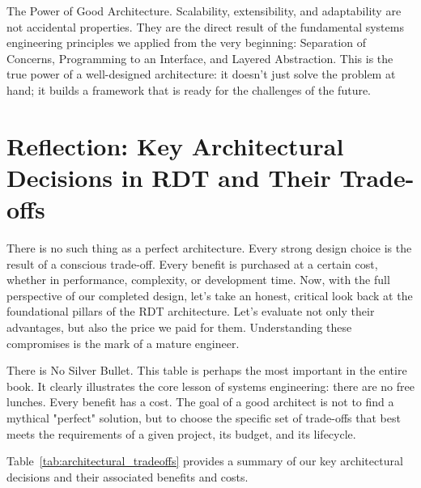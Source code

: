 \begin{principlebox}{The Power of Good Architecture.}
    Scalability, extensibility, and adaptability are not accidental properties. They are the direct result of the fundamental systems engineering principles we applied from the very beginning: Separation of Concerns, Programming to an Interface, and Layered Abstraction. This is the true power of a well-designed architecture: it doesn't just solve the problem at hand; it builds a framework that is ready for the challenges of the future.
\end{principlebox}


\section{Reflection: Key Architectural Decisions in RDT and Their Trade-offs}
\label{sec:reflection_tradeoffs}

There is no such thing as a perfect architecture. Every strong design choice is the result of a conscious trade-off. Every benefit is purchased at a certain cost, whether in performance, complexity, or development time. Now, with the full perspective of our completed design, let's take an honest, critical look back at the foundational pillars of the RDT architecture. Let's evaluate not only their advantages, but also the price we paid for them. Understanding these compromises is the mark of a mature engineer.

\begin{principlebox}{There is No Silver Bullet.}
    This table is perhaps the most important in the entire book. It clearly illustrates the core lesson of systems engineering: there are no free lunches. Every benefit has a cost. The goal of a good architect is not to find a mythical "perfect" solution, but to choose the specific set of trade-offs that best meets the requirements of a given project, its budget, and its lifecycle.
\end{principlebox}

Table~\ref{tab:architectural_tradeoffs} provides a summary of our key architectural decisions and their associated benefits and costs.

